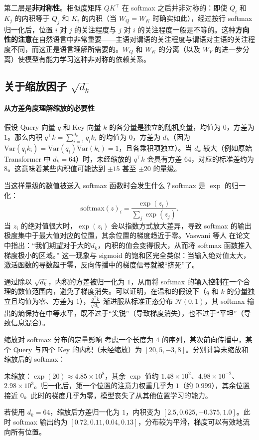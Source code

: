 第二层是\textbf{非对称性}。相似度矩阵 $QK^\top$ 在 softmax 之后并非对称的：即使 $Q_i$ 和 $K_j$ 的内积等于 $Q_j$ 和 $K_i$ 的内积（当 $W_Q = W_K$ 时确实如此），经过按行 softmax 归一化后，位置 $i$ 对 $j$ 的关注程度与 $j$ 对 $i$ 的关注程度一般是不等的。这种\textbf{方向性的注意}在自然语言中非常重要——主语对谓语的关注程度与谓语对主语的关注程度不同，而这正是语言理解所需要的。$W_Q$ 和 $W_K$ 的分离（以及 $W_V$ 的进一步分离）使模型有能力学习这种非对称的依赖关系\cite{shaw2018selfattentionrelativepositionrepresentations}。

\subsection{关于缩放因子 $\sqrt{d_k}$}\label{sec:scaling_factor}

\paragraph{从方差角度理解缩放的必要性}

假设 Query 向量 $q$ 和 Key 向量 $k$ 的各分量是独立的随机变量，均值为 $0$，方差为 $1$。那么内积 $q^\top k = \sum_{i=1}^{d_k} q_i k_i$ 的均值为 $0$，方差为 $d_k$（因为 $\text{Var}(q_i k_i) = \text{Var}(q_i)\text{Var}(k_i) = 1$，且各乘积项独立）。当 $d_k$ 较大（例如原始 Transformer 中 $d_k = 64$）时，未经缩放的 $q^\top k$ 会具有方差 $64$，对应的标准差约为 $8$。这意味着某些内积值可能达到 $\pm 15$ 甚至 $\pm 20$ 的量级。

当这样量级的数值被送入 softmax 函数时会发生什么？softmax 是 $\exp$ 的归一化：
\[
\text{softmax}(z)_i = \frac{\exp(z_i)}{\sum_j \exp(z_j)}.
\]
当 $z_i$ 的绝对值很大时，$\exp(z_i)$ 会以指数方式放大差异，导致 softmax 的输出极度集中于最大值对应的位置，其余位置的梯度趋近于零。Vaswani 等人\cite{vaswani2023attentionneed} 在论文中指出：“我们期望对于大的$d_k$，内积的值会变得很大，从而将 softmax 函数推入梯度极小的区域。” 这一现象与 sigmoid 的饱和区完全类似：当输入绝对值太大，激活函数的导数趋于零，反向传播中的梯度信号就被“挤死”了。

通过除以 $\sqrt{d_k}$，内积的方差被归一化为 $1$，从而将 softmax 的输入控制在一个合理的数值范围内，避免了梯度消失。可以证明，在温和的假设下（$q$ 和 $k$ 的分量独立且均值为零、方差为 $1$），$\frac{q^\top k}{\sqrt{d_k}}$ 渐进服从标准正态分布 $\mathcal{N}(0, 1)$，其 softmax 输出的熵保持在中等水平，既不过于“尖锐”（导致梯度消失），也不过于“平坦”（导致信息混合）\cite{ba2016layernormalization}。

\begin{example}{缩放对 softmax 分布的定量影响}{}
考虑一个长度为 $4$ 的序列，某次前向传播中，某个 Query 与四个 Key 的内积（未经缩放）为 $[20, 5, -3, 8]$。分别计算未缩放和缩放后的 softmax：

未缩放：$\exp(20) \approx 4.85\times 10^8$，其余 $\exp$ 值约 $1.48\times 10^2$、$4.98\times 10^{-2}$、$2.98\times 10^3$。归一化后，第一个位置的注意力权重几乎为 $1$（约 $0.999$），其余位置接近 $0$。此时的梯度几乎为零，模型丧失了从其他位置学习的能力。

若使用 $d_k=64$，缩放后方差归一化为 $1$，内积变为 $[2.5, 0.625, -0.375, 1.0]$。此时 softmax 输出约为 $[0.72, 0.11, 0.04, 0.13]$，分布较为平滑，梯度可以有效地流向所有位置。
\end{example}

